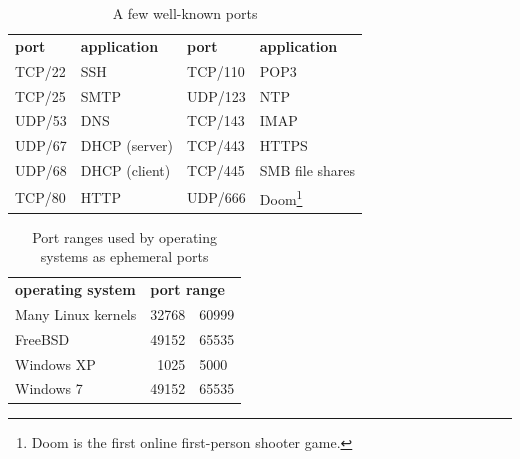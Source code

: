 {\begin{table}
    \centering
    \begin{minipage}{.7\textwidth}
    \centering
    \sffamily
    \begin{tabular}{ll@{\hspace{2cm}}ll}
    \textbf{port} & \textbf{application} & \textbf{port} & \textbf{application} \\[1ex]
     \acs{TCP}/22 & \acs{SSH}           & \acs{TCP}/110 & \acs{POP3} \\
     \acs{TCP}/25 & \acs{SMTP}          & \acs{UDP}/123 & \acs{NTP} \\
     \acs{UDP}/53 & \acs{DNS}           & \acs{TCP}/143 & \acs{IMAP} \\
     \acs{UDP}/67 & \acs{DHCP} (server) & \acs{TCP}/443 & \acs{HTTPS} \\
     \acs{UDP}/68 & \acs{DHCP} (client) & \acs{TCP}/445 & \acs{SMB} file shares \\
     \acs{TCP}/80 & \acs{HTTP}          & \acs{UDP}/666 & Doom\footnote{Doom is the first online first-person shooter game.}\\
    \end{tabular}
    \end{minipage}
    \caption{A few well-known ports}
    \label{tab:port-numbers}
\end{table}

\begin{table}
    \centering
    \sffamily
    \begin{tabular}{lr@{--}l}
    \textbf{operating system} & \multicolumn{2}{l}{\textbf{port range}} \\[1ex]
    Many Linux kernels & \num{32768} & \num{60999} \\
    FreeBSD            & \num{49152} & \num{65535} \\
    Windows XP         & \num{1025} & \num{5000} \\
    Windows 7          & \num{49152} & \num{65535} \\
    \end{tabular}
    \caption{Port ranges used by operating systems as ephemeral ports}
    \label{tab:ephemeral-ports}
\end{table}
}



